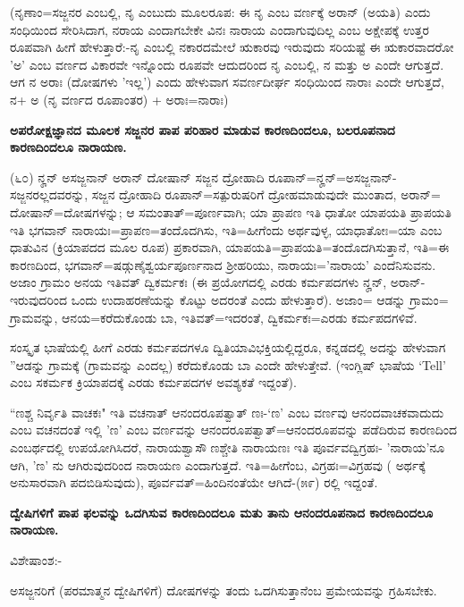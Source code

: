(ನೃಣಾಂ=ಸಜ್ಜನರ ಎಂಬಲ್ಲಿ, ನೃ ಎಂಬುದು ಮೂಲರೂಪ: ಈ ನೃ ಎಂಬ ವರ್ಣಕ್ಕೆ ಅರಾನ್ (ಅಯತಿ) ಎಂದು ಸಂಧಿಯಿಂದ ಸೇರಿಸಿದಾಗ, ನರಾಯ ಎಂದಾಗಬೇಕೇ ವಿನಃ ನಾರಾಯ ಎಂದಾಗುವುದಿಲ್ಲ ಎಂಬ ಅಕ್ಷೇಪಕ್ಕೆ ಉತ್ತರ ರೂಪವಾಗಿ ಹೀಗೆ ಹೇಳುತ್ತಾರೆ:-ನೃ ಎಂಬಲ್ಲಿ ನಕಾರದಮೇಲೆ ಋಕಾರವು ಇರುವುದು ಸರಿಯಷ್ಟೆ ಈ ಋಕಾರವಾದರೋ 'ಅ' ಎಂಬ ವರ್ಣದ ವಿಕಾರವೇ ಇನ್ನೊಂದು ರೂಪವೇ ಆದುದರಿಂದ ನೃ ಎಂಬಲ್ಲಿ, ನ ಮತ್ತು ಅ ಎಂದೇ ಆಗುತ್ತದೆ. ಆಗ ನ ಅರಾಃ (ದೋಷಗಳು 'ಇಲ್ಲ') ಎಂದು ಹೇಳುವಾಗ ಸವರ್ಣದೀರ್ಘ ಸಂಧಿಯಿಂದ ನಾರಾಃ ಎಂದೇ ಆಗುತ್ತದೆ, ನ+ ಅ (ನೃ ವರ್ಣದ ರೂಪಾಂತರ) + ಅರಾಃ=ನಾರಾಃ)

\begin{center}
\textbf{ಅಪರೋಕ್ಷಜ್ಞಾನದ ಮೂಲಕ ಸಜ್ಜನರ ಪಾಪ ಪರಿಹಾರ ಮಾಡುವ ಕಾರಣದಿಂದಲೂ, ಬಲರೂಪನಾದ ಕಾರಣದಿಂದಲೂ ನಾರಾಯಣ.}
\end{center}

(೬೦) ನೄನ್ ಅಸಜ್ಜನಾನ್ ಅರಾನ್ ದೋಷಾನ್ ಸಜ್ಜನ ದ್ರೋಹಾದಿ ರೂಪಾನ್=ನೄನ್=ಅಸಜ್ಜನಾನ್-ಸಜ್ಜನರಲ್ಲದವರನ್ನು, ಸಜ್ಜನ ದ್ರೋಹಾದಿ ರೂಪಾನ್=ಸತ್ಪುರುಷರಿಗೆ ದ್ರೋಹಮಾಡುವುದೇ ಮುಂತಾದ, ಅರಾನ್= ದೋಷಾನ್=ದೋಷಗಳನ್ನು; ಆ ಸಮಂತಾತ್=ಪೂರ್ಣವಾಗಿ; ಯಾ ಪ್ರಾಪಣ ಇತಿ ಧಾತೋ ಯಾಪಯತಿ ಪ್ರಾಪಯತಿ ಇತಿ ಭಗವಾನ್ ನಾರಾಯಃ=ಪ್ರಾಪಣ=ತಂದೊದಗಿಸು, ಇತಿ=ಹೀಗೆಂದು ಅರ್ಥವುಳ್ಳ, ಯಾಧಾತೋಃ=ಯಾ ಎಂಬ ಧಾತುವಿನ (ಕ್ರಿಯಾಪದದ ಮೂಲ ರೂಪ) ಪ್ರಕಾರವಾಗಿ, ಯಾಪಯತಿ=ಪ್ರಾಪಯತಿ=ತಂದೊದಗಿಸುತ್ತಾನೆ, ಇತಿ=ಈ ಕಾರಣದಿಂದ, ಭಗವಾನ್=ಷಡ್ಗುಣೈಶ್ವರ್ಯಪೂರ್ಣನಾದ ಶ‍್ರೀಹರಿಯು, ನಾರಾಯಃ='ನಾರಾಯ' ಎಂದೆನಿಸುವನು. ಅಜಾಂ ಗ್ರಾಮಂ ಅನಯ ಇತಿವತ್ ದ್ವಿಕರ್ಮಕಃ (ಈ ಪ್ರಯೋಗದಲ್ಲಿ ಎರಡು ಕರ್ಮಪದಗಳು ನೄನ್, ಅರಾನ್-ಇರುವುದರಿಂದ ಒಂದು ಉದಾಹರಣೆಯನ್ನು ಕೊಟ್ಟು ಅದರಂತೆ ಎಂದು ಹೇಳುತ್ತಾರೆ). ಅಜಾಂ= ಆಡನ್ನು ಗ್ರಾಮಂ= ಗ್ರಾಮವನ್ನು, ಆನಯ=ಕರೆದುಕೊಂಡು ಬಾ, ಇತಿವತ್=ಇದರಂತೆ, ದ್ವಿಕರ್ಮಕಃ=ಎರಡು ಕರ್ಮಪದಗಳಿವೆ.

ಸಂಸ್ಕೃತ ಭಾಷೆಯಲ್ಲಿ ಹೀಗೆ ಎರಡು ಕರ್ಮಪದಗಳೂ ದ್ವಿತಿಯಾವಿಭಕ್ತಿಯಲ್ಲಿದ್ದರೂ, ಕನ್ನಡದಲ್ಲಿ ಅದನ್ನು ಹೇಳುವಾಗ ''ಆಡನ್ನು ಗ್ರಾಮಕ್ಕೆ (ಗ್ರಾಮವನ್ನು ಎಂದಲ್ಲ) ಕರೆದುಕೊಂಡು ಬಾ ಎಂದೇ ಹೇಳುತ್ತೇವೆ. (ಇಂಗ್ಲಿಷ್ ಭಾಷೆಯ `Tell' ಎಂಬ ಸಕರ್ಮಕ ಕ್ರಿಯಾಪದಕ್ಕೆ ಎರಡು ಕರ್ಮಪದಗಳ ಅವಶ್ಯಕತೆ ಇದ್ದಂತೆ).

``ಣಶ್ಚ ನಿರ್ವೃತಿ ವಾಚಕಃ" ಇತಿ ವಚನಾತ್ ಆನಂದರೂಪತ್ವಾತ್ ಣಃ-`ಣ' ಎಂಬ ವರ್ಣವು ಆನಂದವಾಚಕವಾದುದು ಎಂಬ ವಚನದಂತೆ ಇಲ್ಲಿ 'ಣ' ಎಂಬ ವರ್ಣವನ್ನು ಆನಂದರೂಪತ್ವಾತ್=ಆನಂದರೂಪವನ್ನು ಪಡೆದಿರುವ ಕಾರಣದಿಂದ ಎಂಬರ್ಥದಲ್ಲಿ ಉಪಯೋಗಿಸಿದರೆ, ನಾರಾಯಶ್ವಾಸೌ ಣಶ್ಚೇತಿ ನಾರಾಯಣಃ ಇತಿ ಪೂರ್ವವದ್ವಿಗ್ರಹಃ- 'ನಾರಾಯ'ನೂ ಆಗಿ, 'ಣ' ನು ಆಗಿರುವುದರಿಂದ ನಾರಾಯಣ ಎಂದಾಗುತ್ತದೆ. ಇತಿ=ಹೀಗೆಂಬ, ವಿಗ್ರಹಃ=ವಿಗ್ರಹವು ( ಅರ್ಥಕ್ಕೆ ಅನುಸಾರವಾಗಿ ಪದಬಿಡಿಸುವುದು), ಪೂರ್ವವತ್=ಹಿಂದಿನಂತೆಯೇ ಆಗಿದೆ-(೫೯) ರಲ್ಲಿ ಇದ್ದಂತೆ.

\begin{center}
\textbf{ ದ್ವೇಷಿಗಳಿಗೆ ಪಾಪ ಫಲವನ್ನು ಒದಗಿಸುವ ಕಾರಣದಿಂದಲೂ ಮತು ತಾನು ಆನಂದರೂಪನಾದ ಕಾರಣದಿಂದಲೂ ನಾರಾಯಣ.}
\end{center}

\noindent
ವಿಶೇಷಾಂಶ:-

ಅಸಜ್ಜನರಿಗೆ (ಪರಮಾತ್ಮನ ದ್ವೇಷಿಗಳಿಗೆ) ದೋಷಗಳನ್ನು ತಂದು ಒದಗಿಸುತ್ತಾನೆಂಬ ಪ್ರಮೇಯವನ್ನು ಗ್ರಹಿಸಬೇಕು.

